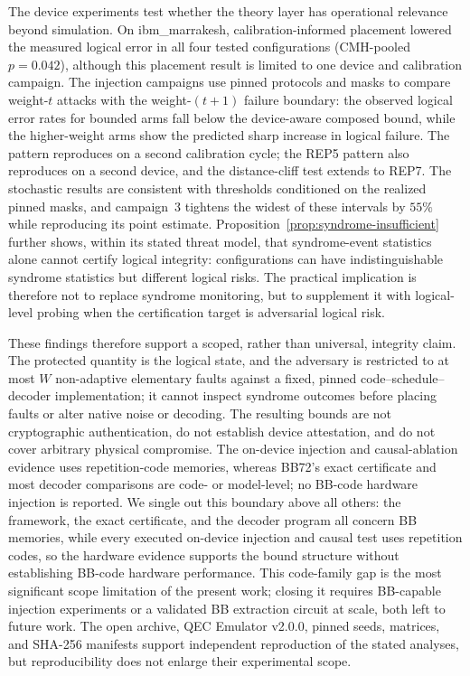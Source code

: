 \documentclass[pdflatex,sn-mathphys-num]{sn-jnl}
\theoremstyle{thmstyleone}
\theoremstyle{thmstyletwo}
\theoremstyle{thmstylethree}
\begin{document}
The device experiments test whether the theory layer has operational relevance beyond simulation. On ibm\_marrakesh, calibration-informed placement lowered the measured logical error in all four tested configurations (CMH-pooled $p=0.042$), although this placement result is limited to one device and calibration campaign. The injection campaigns use pinned protocols and masks to compare weight-$t$ attacks with the weight-$(t+1)$ failure boundary: the observed logical error rates for bounded arms fall below the device-aware composed bound, while the higher-weight arms show the predicted sharp increase in logical failure. The pattern reproduces on a second calibration cycle; the REP5 pattern also reproduces on a second device, and the distance-cliff test extends to REP7. The stochastic results are consistent with thresholds conditioned on the realized pinned masks, and campaign~3 tightens the widest of these intervals by $55\%$ while reproducing its point estimate. Proposition~\ref{prop:syndrome-insufficient} further shows, within its stated threat model, that syndrome-event statistics alone cannot certify logical integrity: configurations can have indistinguishable syndrome statistics but different logical risks. The practical implication is therefore not to replace syndrome monitoring, but to supplement it with logical-level probing when the certification target is adversarial logical risk.

These findings therefore support a scoped, rather than universal, integrity claim. The protected quantity is the logical state, and the adversary is restricted to at most $W$ non-adaptive elementary faults against a fixed, pinned code--schedule--decoder implementation; it cannot inspect syndrome outcomes before placing faults or alter native noise or decoding. The resulting bounds are not cryptographic authentication, do not establish device attestation, and do not cover arbitrary physical compromise. The on-device injection and causal-ablation evidence uses repetition-code memories, whereas BB72's exact certificate and most decoder comparisons are code- or model-level; no BB-code hardware injection is reported. We single out this boundary above all others: the framework, the exact certificate, and the decoder program all concern BB memories, while every executed on-device injection and causal test uses repetition codes, so the hardware evidence supports the bound structure without establishing BB-code hardware performance. This code-family gap is the most significant scope limitation of the present work; closing it requires BB-capable injection experiments or a validated BB extraction circuit at scale, both left to future work. The open archive, QEC Emulator v2.0.0, pinned seeds, matrices, and SHA-256 manifests support independent reproduction of the stated analyses, but reproducibility does not enlarge their experimental scope.
\end{document}
